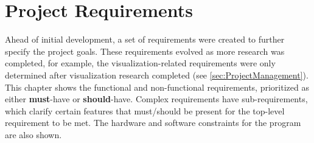 
\newcommand{\must}[0]{\textbf{must}}
\newcommand{\should}[0]{\textbf{should}}
\newcommand{\shouldnt}[0]{\textbf{should not}}


\chapter{Project Requirements}
\label{sec:Requirements}
Ahead of initial development, a set of requirements were created to further specify the project goals.
These requirements evolved as more research was completed, for example, the visualization-related requirements were only determined after visualization research completed (see \cref{sec:ProjectManagement}).
This chapter shows the functional and non-functional requirements, prioritized as either \must{}-have or \should{}-have.
Complex requirements have sub-requirements, which clarify certain features that must/should be present for the top-level requirement to be met.
The hardware and software constraints for the program are also shown.








